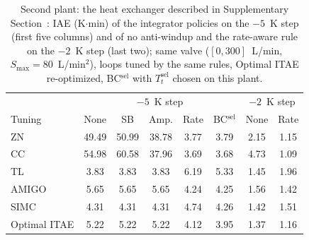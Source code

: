 \begin{table}[t]
\centering
\footnotesize
\setlength{\tabcolsep}{3pt}
\caption{Second plant: the heat exchanger described in Supplementary Section~: IAE (K$\cdot$min) of the integrator policies on the $-5$~K step (first five columns) and of no anti-windup and the rate-aware rule on the $-2$~K step (last two); same valve ($[0, 300]$~L/min, $S_{\max} = 80$~L/min$^2$), loops tuned by the same rules, Optimal ITAE re-optimized, BC$^{\mathrm{sel}}$ with $T_t^{\mathrm{sel}}$ chosen on this plant.}
\label{tab:hx}
\begin{tabular}{lccccccc}
\toprule
 & \multicolumn{5}{c}{$-5$~K step} & \multicolumn{2}{c}{$-2$~K step} \\
Tuning & None & SB & Amp. & Rate & BC$^{\mathrm{sel}}$ & None & Rate \\
\midrule
ZN & 49.49 & 50.99 & 38.78 & 3.77 & 3.79 & 2.15 & 1.15 \\
CC & 54.98 & 60.58 & 37.96 & 3.69 & 3.68 & 4.73 & 1.09 \\
TL & 3.83 & 3.83 & 3.83 & 6.19 & 5.33 & 1.45 & 1.96 \\
AMIGO & 5.65 & 5.65 & 5.65 & 4.24 & 4.25 & 1.56 & 1.42 \\
SIMC & 4.31 & 4.31 & 4.31 & 4.74 & 4.26 & 1.42 & 1.51 \\
Optimal ITAE & 5.22 & 5.22 & 5.22 & 4.12 & 3.95 & 1.37 & 1.16 \\
\bottomrule
\end{tabular}
\end{table}
